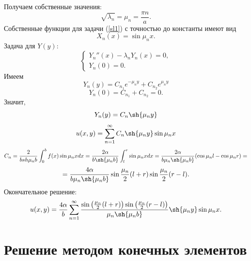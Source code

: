 \documentclass{report}
\begin{document}
Получаем собственные значения:
\begin{equation*}
	\sqrt{\lambda_n}=\mu_n=\frac{\pi n}{a} .
\end{equation*}
Собственные функции для задачи (\ref{sl1}) с точностью до константы имеют вид
\begin{equation*}
	X_n(x)=\sin{\mu_n x}.
\end{equation*}
Задача для $Y(y)$:
\begin{equation}\label{sl2}
	\begin{cases}
		Y_n''(x)-\lambda_n Y_n(x)=0,\\
		Y_n(0)=0.
	\end{cases}
\end{equation}
Имеем
\begin{equation}
	Y_n(y)=C_{n_1}e^{-\mu_n  y}+C_{n_2}e^{\mu_n  y}
\end{equation}
\begin{equation*}
	Y_n(0)=C_{n_1} + C_{n_2} = 0.
\end{equation*}
Значит,
\begin{equation}
	Y_n(y)=C_n \sh{\mu_n y}
\end{equation}
\begin{equation}
	u(x,y) = \sum_{n=1}^{\infty}C_n \sh{\mu_n y} \sin{\mu_n x}
\end{equation}
\begin{equation*}
	C_n = \frac{2}{b sh{\mu_n b}}\int_0^b f(x) \sin{\mu_n x} dx = \frac{2\alpha}{b\sh{\mu_n b}}\int_l^r\sin{\mu_nx}dx =  \frac{2\alpha}{b\mu_n\sh{\mu_n b}}(\cos{\mu_n l} - \cos{\mu_n r})=
\end{equation*}
\begin{equation}
	=\frac{4\alpha}{b\mu_n\sh{\mu_n b}}\sin{\frac{\mu_n}{2}(l+r)}\sin{\frac{\mu_n}{2}(r-l)}.
\end{equation}
Окончательное решение:
\begin{equation}
	u(x,y)=\frac{4\alpha}{b}\sum_{n=1}^{\infty}\frac{\sin{\left(\frac{\mu_n}{2}(l+r)\right)}\sin{\left(\frac{\mu_n}{2}(r-l)\right)}}{\mu_n\sh{\mu_n b}}\sh{\mu_n y} \sin{\mu_n x}.
\end{equation}

\section{Решение методом конечных элементов}
\end{document}
